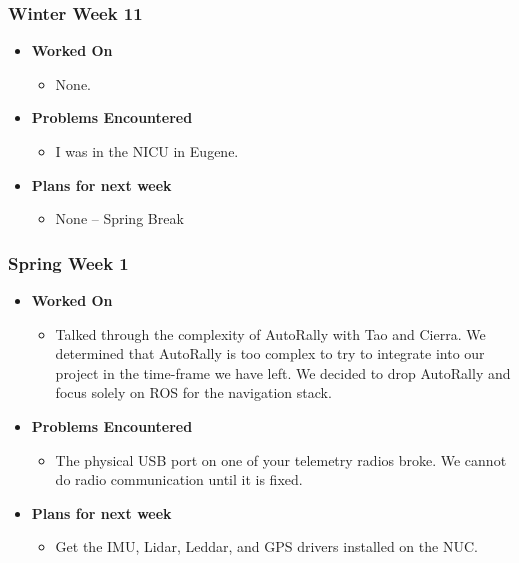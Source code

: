 \documentclass[compsoc,draftclsnofoot,onecolumn,10pt]{IEEEtran}
\begin{document}
\subsubsection{Winter Week 11}
\begin{itemize}
    \item {\textbf{Worked On}}
    \begin{itemize}
        \item None.
    \end{itemize}

    \item {\textbf{Problems Encountered}}
    \begin{itemize}
        \item I was in the NICU in Eugene.
    \end{itemize}

    \item{\textbf{Plans for next week}}
    \begin{itemize}
        \item None -- Spring Break
    \end{itemize}
\end{itemize}

\subsubsection{Spring Week 1}
\begin{itemize}
    \item {\textbf{Worked On}}
    \begin{itemize}
        \item Talked through the complexity of AutoRally with Tao and Cierra. We determined that AutoRally is too complex to try to integrate into our project in the time-frame we have left. We decided to drop AutoRally and focus solely on ROS for the navigation stack.
    \end{itemize}

    \item {\textbf{Problems Encountered}}
    \begin{itemize}
        \item The physical USB port on one of your telemetry radios broke. We cannot do radio communication until it is fixed.
    \end{itemize}

    \item{\textbf{Plans for next week}}
    \begin{itemize}
        \item Get the IMU, Lidar, Leddar, and GPS drivers installed on the NUC.
    \end{itemize}
\end{itemize}
\end{document}
